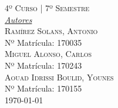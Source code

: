 \documentclass[12pt,a4paper, spanish]{article}
\begin{document}
\begin{titlepage}
    \textsc{\large 4º Curso | 7º Semestre}\\[1.5cm]

    {\large\underline{\textit{Autores}}}\\[0.2cm]
       \textsc{Ramírez Solans, Antonio}\\
               Nº Matrícula: 170035\\[0.2cm]
       \textsc{Miguel Alonso, Carlos}\\
               Nº Matrícula: 170243\\[0.2cm]
       \textsc{Aouad Idrissi Boulid, Younes}\\
               Nº Matrícula: 170155\\[0.2cm]

    \vfill\vfill\vfill
    {\large\today}


\end{titlepage}


\newpage
\thispagestyle{empty}
\renewcommand*\contentsname{Índice de Contenidos}
\tableofcontents

\newpage
{}
\end{document}
